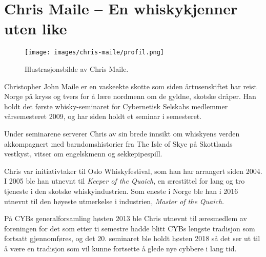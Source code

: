 \chapter{Chris Maile -- En whiskykjenner uten like}

\author{Skrevet av Torgeir Lebesbye}

\begin{wrapfigure}{l}{6.5cm}
	\centering
	\texttt{[image: images/chris-maile/profil.png]}
	\label{fig:chris-maile}
	\caption{Illustrasjonsbilde av Chris Maile.}
\end{wrapfigure}

Christopher John Maile er en vaskeekte skotte som siden årtusenskiftet har reist Norge på kryss og tvers for å lære nordmenn om de gyldne, skotske dråper. Han holdt det første whisky-seminaret for Cybernetisk Selskabs medlemmer vårsemesteret 2009, og har siden holdt et seminar i semesteret.

Under seminarene serverer Chris av sin brede innsikt om whiskyens verden akkompagnert med barndomshistorier fra The Isle of Skye på Skottlands vestkyst, vitser om engelskmenn og sekkepipespill.

Chris var initiativtaker til Oslo Whiskyfestival, som han har arrangert siden 2004. I 2005 ble han utnevnt til \textit{Keeper of the Quaich}, en ærestittel for lang og tro tjeneste i den skotske whiskyindustrien. Som eneste i Norge ble han i 2016 utnevnt til den høyeste utmerkelse i industrien, \textit{Master of the Quaich}.

På CYBs generalforsamling høsten 2013 ble Chris utnevnt til æresmedlem av foreningen for det som etter ti semestre hadde blitt CYBs lengste tradisjon som fortsatt gjennomføres, og det 20. seminaret ble holdt høsten 2018 så det ser ut til å være en tradisjon som vil kunne fortsette å glede nye cybbere i lang tid.
